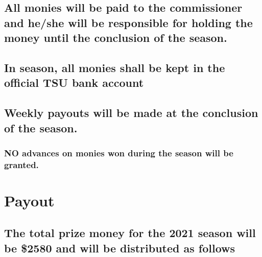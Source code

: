 \documentclass[
]{book}
\begin{document}
\hypertarget{all-monies-will-be-paid-to-the-commissioner-and-heshe-will-be-responsible-for-holding-the-money-until-the-conclusion-of-the-season.}{%
\subsection{All monies will be paid to the commissioner and he/she will be responsible for holding the money until the conclusion of the season.}\label{all-monies-will-be-paid-to-the-commissioner-and-heshe-will-be-responsible-for-holding-the-money-until-the-conclusion-of-the-season.}}

\hypertarget{in-season-all-monies-shall-be-kept-in-the-official-tsu-bank-account}{%
\subsection{In season, all monies shall be kept in the official TSU bank account}\label{in-season-all-monies-shall-be-kept-in-the-official-tsu-bank-account}}

\hypertarget{weekly-payouts-will-be-made-at-the-conclusion-of-the-season.}{%
\subsection{Weekly payouts will be made at the conclusion of the season.}\label{weekly-payouts-will-be-made-at-the-conclusion-of-the-season.}}

\hypertarget{no-advances-on-monies-won-during-the-season-will-be-granted.}{%
\subsubsection{NO advances on monies won during the season will be granted.}\label{no-advances-on-monies-won-during-the-season-will-be-granted.}}

\hypertarget{payout}{%
\section{Payout}\label{payout}}

\hypertarget{the-total-prize-money-for-the-2021-season-will-be-2580-and-will-be-distributed-as-follows}{%
\subsection{The total prize money for the 2021 season will be \$2580 and will be distributed as follows}\label{the-total-prize-money-for-the-2021-season-will-be-2580-and-will-be-distributed-as-follows}}
\end{document}
